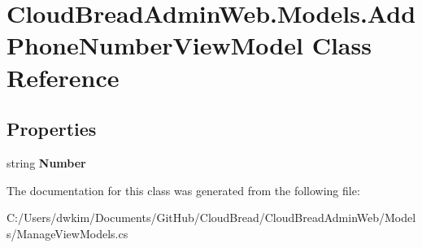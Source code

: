\hypertarget{a00008}{}\section{Cloud\+Bread\+Admin\+Web.\+Models.\+Add\+Phone\+Number\+View\+Model Class Reference}
\label{a00008}
\subsection*{Properties}
\begin{DoxyCompactItemize}
\item 
string {\bfseries Number}\hypertarget{a00008_ac981dffb33a13c066b34c9c8e7b39c03}{}\label{a00008_ac981dffb33a13c066b34c9c8e7b39c03}

\end{DoxyCompactItemize}


The documentation for this class was generated from the following file\+:\begin{DoxyCompactItemize}
\item 
C\+:/\+Users/dwkim/\+Documents/\+Git\+Hub/\+Cloud\+Bread/\+Cloud\+Bread\+Admin\+Web/\+Models/Manage\+View\+Models.\+cs\end{DoxyCompactItemize}
